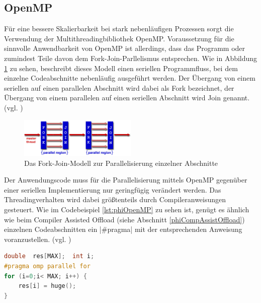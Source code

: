 \documentclass[../main.tex]{subfiles}
\begin{document}
\subsection{OpenMP}
Für eine bessere Skalierbarkeit bei stark nebenläufigen Prozessen sorgt die Verwendung der Multithreadingbibliothek OpenMP. Voraussetzung für die sinnvolle Anwendbarkeit von OpenMP ist allerdings, dass das Programm oder zumindest Teile davon dem Fork-Join-Parllelismus entsprechen. Wie in Abbildung \ref{pic:phiForkJoin} zu sehen, beschreibt dieses Modell einen seriellen Programmfluss, bei dem einzelne Codeabschnitte nebenläufig ausgeführt werden. Der Übergang von einem seriellen auf einen parallelen Abschnitt wird dabei als Fork bezeichnet, der Übergang von einem parallelen auf einen seriellen Abschnitt wird Join genannt. (vgl. \cite{phiOpenmpDoku})
\begin{figure}
	\centering 
	\includegraphics[width=0.5\textwidth]{../images/Schmidt/fork_join.jpg} 
	\caption {Das Fork-Join-Modell zur Parallelisierung einzelner Abschnitte}
	\label{pic:phiForkJoin} 
\end{figure} 
Der Anwendungscode muss für die Parallelisierung mittels OpenMP gegenüber einer seriellen Implementierung nur geringfügig verändert werden. Das Threadingverhalten wird dabei größtenteils durch Compileranweisungen gesteuert. Wie im Codebeispiel \ref{lst:phiOpenMP} zu sehen ist, genügt es ähnlich wie beim Compiler Assisted Offload (siehe Abschnitt \ref{phiCompAssistOffload}) einzelnen Codeabschnitten ein |#pragma| mit der entsprechenden Anweisung voranzustellen. (vgl. \cite{phiOpenmpDoku})
\begin{lstlisting}[language=c, caption={Beispielfunktion mit pragma zur Nebenläufigen Ausführung einer for-Schleife(Quelle: \parencite{phiOpenmpDoku})}, captionpos=b, label=lst:phiOpenMP, frame=single, linewidth=\textwidth, breaklines=true]
double  res[MAX];  int i;
#pragma omp parallel for
for (i=0;i< MAX; i++) {
	res[i] = huge();
}
\end{lstlisting}
\end{document}

